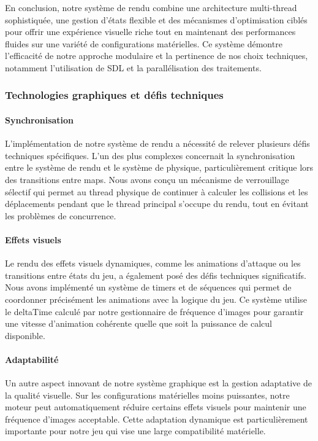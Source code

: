 \documentclass[12pt,a4paper, twoside]{article}
\begin{document}
En conclusion, notre système de rendu combine une architecture multi-thread sophistiquée, une gestion d'états flexible et des mécanismes d'optimisation ciblés pour offrir une expérience visuelle riche tout en maintenant des performances fluides sur une variété de configurations matérielles. Ce système démontre l'efficacité de notre approche modulaire et la pertinence de nos choix techniques, notamment l'utilisation de SDL et la parallélisation des traitements.

\subsubsection{Technologies graphiques et défis techniques}
\paragraph{Synchronisation} L'implémentation de notre système de rendu a nécessité de relever plusieurs défis techniques spécifiques. L'un des plus complexes concernait la synchronisation entre le système de rendu et le système de physique, particulièrement critique lors des transitions entre maps. Nous avons conçu un mécanisme de verrouillage sélectif qui permet au thread physique de continuer à calculer les collisions et les déplacements pendant que le thread principal s'occupe du rendu, tout en évitant les problèmes de concurrence.

\paragraph{Effets visuels} Le rendu des effets visuels dynamiques, comme les animations d'attaque ou les transitions entre états du jeu, a également posé des défis techniques significatifs. Nous avons implémenté un système de timers et de séquences qui permet de coordonner précisément les animations avec la logique du jeu. Ce système utilise le deltaTime calculé par notre gestionnaire de fréquence d'images pour garantir une vitesse d'animation cohérente quelle que soit la puissance de calcul disponible.

\paragraph{Adaptabilité} Un autre aspect innovant de notre système graphique est la gestion adaptative de la qualité visuelle. Sur les configurations matérielles moins puissantes, notre moteur peut automatiquement réduire certains effets visuels pour maintenir une fréquence d'images acceptable. Cette adaptation dynamique est particulièrement importante pour notre jeu qui vise une large compatibilité matérielle.
\end{document}
